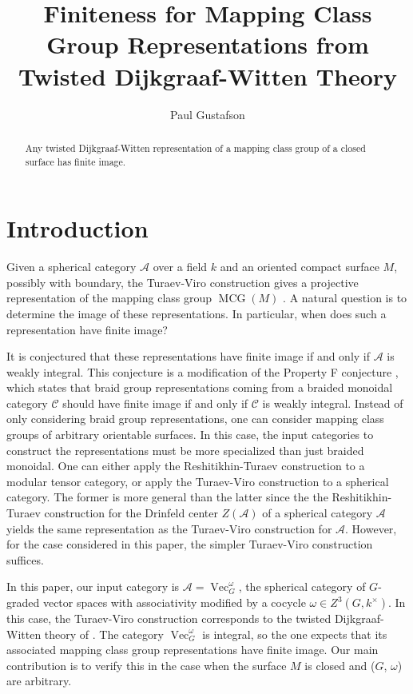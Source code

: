 \documentclass{amsart}
\DeclareMathOperator{\MCG}{MCG}
\DeclareMathOperator{\Vect}{Vec}
\begin{document}
\title{Finiteness for Mapping Class Group Representations from Twisted Dijkgraaf-Witten Theory}


\author{Paul Gustafson}
\address{Department of Mathematics,
    Texas A\&M University,
    College Station, TX
    U.S.A.}
    

\begin{abstract}
Any twisted Dijkgraaf-Witten representation of a mapping class group of a closed surface has finite image.
\end{abstract}

\maketitle

\section{Introduction}
Given a spherical category $\mathcal A$ over a field $k$ and an oriented compact surface $M$, possibly with boundary, the Turaev-Viro construction gives a projective representation of the mapping class group $\MCG(M)$ \cite{TURAEV1992865, hep-th/9311155}.  A natural question is to determine the image of these representations.  In particular,  when does such a representation have finite image?

It is conjectured that these representations have finite image if and only if  $\mathcal A$ is weakly integral.  This conjecture is a modification of the Property F conjecture \cite{nr, erw}, which states that braid group representations coming from a braided monoidal category $\mathcal C$ should have finite image if and only if $\mathcal C$ is weakly integral.  Instead of only considering braid group representations, one can consider mapping class groups of arbitrary orientable surfaces.  In this case, the input categories to construct the representations must be more specialized than just braided monoidal.  One can either apply the Reshitikhin-Turaev construction to a modular tensor category, or apply the Turaev-Viro construction to a spherical category.  The former is more general than the latter since the the Reshitikhin-Turaev construction for the Drinfeld center $Z(\mathcal A)$ of a spherical category $\mathcal A$ yields the same representation as the Turaev-Viro construction for $\mathcal A$.  However, for the case considered in this paper, the simpler Turaev-Viro construction suffices.

In this paper, our input category is  $\mathcal A = \Vect_G^\omega$, the spherical category of $G$-graded vector spaces with associativity modified by a cocycle $\omega \in Z^3(G, k^\times)$.  In this case, the Turaev-Viro construction corresponds to the twisted Dijkgraaf-Witten theory of \cite{dijkgraaf1990}.  The category $\Vect_G^\omega$ is integral, so the one expects that its associated mapping class group representations have finite image.  Our main contribution is to verify this in the case  when the surface $M$ is closed and ($G$, $\omega$) are arbitrary.  
\end{document}
